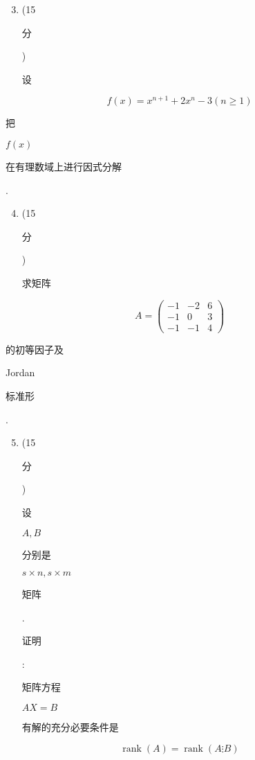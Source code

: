 \documentclass[10pt]{article}
\begin{document}
\begin{enumerate}
  \setcounter{enumi}{2}
  \item (15 \begin{CJK}{UTF8}{mj}分\end{CJK}) \begin{CJK}{UTF8}{mj}设\end{CJK}
\end{enumerate}
$$
f(x)=x^{n+1}+2 x^{n}-3(n \geqslant 1)
$$
\begin{CJK}{UTF8}{mj}把\end{CJK} $f(x)$ \begin{CJK}{UTF8}{mj}在有理数域上进行因式分解\end{CJK}.

\begin{enumerate}
  \setcounter{enumi}{3}
  \item (15 \begin{CJK}{UTF8}{mj}分\end{CJK}) \begin{CJK}{UTF8}{mj}求矩阵\end{CJK}
\end{enumerate}
$$
A=\left(\begin{array}{ccc}
-1 & -2 & 6 \\
-1 & 0 & 3 \\
-1 & -1 & 4
\end{array}\right)
$$
\begin{CJK}{UTF8}{mj}的初等因子及\end{CJK} Jordan \begin{CJK}{UTF8}{mj}标准形\end{CJK}.

\begin{enumerate}
  \setcounter{enumi}{4}
  \item (15 \begin{CJK}{UTF8}{mj}分\end{CJK}) \begin{CJK}{UTF8}{mj}设\end{CJK} $A, B$ \begin{CJK}{UTF8}{mj}分别是\end{CJK} $s \times n, s \times m$ \begin{CJK}{UTF8}{mj}矩阵\end{CJK}. \begin{CJK}{UTF8}{mj}证明\end{CJK}: \begin{CJK}{UTF8}{mj}矩阵方程\end{CJK} $A X=B$ \begin{CJK}{UTF8}{mj}有解的充分必要条件是\end{CJK}
\end{enumerate}
$$
\operatorname{rank}(A)=\operatorname{rank}(A \vdots B)
$$
\end{document}
